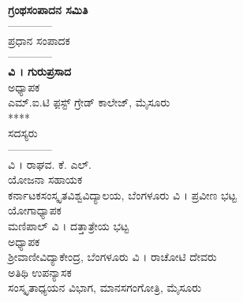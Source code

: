 \thispagestyle{empty}
~
\vfill
\noindent
\begin{center}
\fboxsep=20pt
{}
\end{center}
\vfill
\eject
\thispagestyle{empty}
\begin{center}

{\LARGE\bfseries ಗ್ರಂಥಸಂಪಾದನ ಸಮಿತಿ}\\
––––––––\\
\vfill
ಪ್ರಧಾನ ಸಂಪಾದಕ\\
––––––––\\
{\Large\bfseries ವಿ । ಗುರುಪ್ರಸಾದ}\\
ಅಧ್ಯಾಪಕ\\
ಎಮ್.ಐ.ಟಿ ಫ಼ಸ್ಟ್ ಗ್ರೇಡ್ ಕಾಲೇಜ್, ಮೈಸೂರು  \\
****\\
\vfill
ಸದಸ್ಯರು\\
––––––––\\
{\Large ವಿ । ರಾಘವ. ಕೆ. ಎಲ್.}\\
ಯೋಜನಾ ಸಹಾಯಕ\\
ಕರ್ನಾಟಕಸಂಸ್ಕೃತವಿಶ್ವವಿದ್ಯಾಲಯ, ಬೆಂಗಳೂರು
\vfill
{\Large ವಿ । ಪ್ರವೀಣ ಭಟ್ಟ}\\
ಯೋಗಾಧ್ಯಾಪಕ\\
ಮಣಿಪಾಲ್
\vfill
{\Large ವಿ । ದತ್ತಾತ್ರೇಯ ಭಟ್ಟ}\\
ಅಧ್ಯಾಪಕ\\
ಶ್ರೀವಾಣೀವಿದ್ಯಾಕೇಂದ್ರ, ಬೆಂಗಳೂರು
\vfill
{\Large ವಿ । ರಾಚೋಟಿ ದೇವರು}\\
ಅತಿಥಿ ಉಪನ್ಯಾಸಕ\\
ಸಂಸ್ಕೃತಾಧ್ಯಯನ ವಿಭಾಗ, ಮಾನಸಗಂಗೋತ್ರಿ, ಮೈಸೂರು

\end{center}
